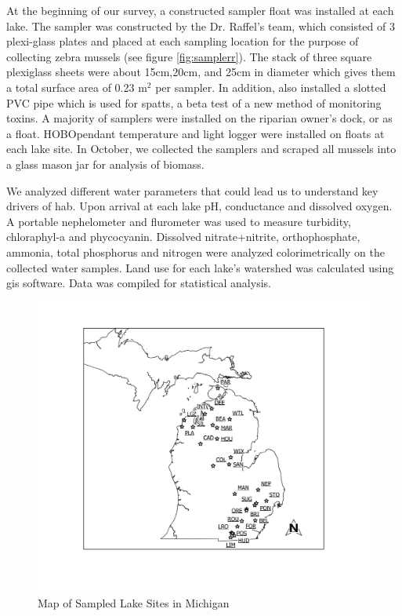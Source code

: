 At the beginning of our survey, a constructed sampler float was installed at each lake. The sampler was constructed by the Dr. Raffel's team, which consisted of 3 plexi-glass plates and placed at each sampling location for the purpose of collecting zebra mussels (see figure \ref{fig:samplerr}). The stack of three square plexiglass sheets were about 15cm,20cm, and 25cm in diameter which gives them a total surface area of 0.23 m$^2$ per sampler. In addition, also installed a slotted PVC pipe which is used for \gls{spatts}, a beta test of a new method of monitoring toxins. A majority of samplers were installed on the riparian owner's dock, or as a float. HOBO\texttrademark pendant temperature and light logger were installed on floats at each lake site. In October, we collected the samplers and scraped all mussels into a glass mason jar for analysis of biomass.

We analyzed different water parameters that could lead us to understand key drivers of \gls{hab}. Upon arrival at each lake pH, conductance and dissolved oxygen. A portable nephelometer and flurometer was used to measure turbidity, chloraphyl-a and phycocyanin. Dissolved nitrate+nitrite, orthophosphate, ammonia, total phosphorus and nitrogen were analyzed colorimetrically on the collected water samples. Land use for each lake's watershed was calculated using \gls{gis} software. Data was compiled for statistical analysis.

\begin{figure}[!h]
\includegraphics[width=\textwidth]{figures/Overview}
\caption{Map of Sampled Lake Sites in Michigan}
\label{fig:overview}
\end{figure}

